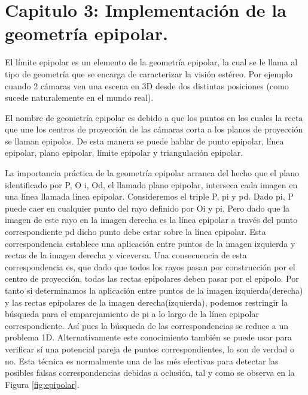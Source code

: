 \documentclass[11pt,letterpaper]{article}     %
\begin{document}



\section{Capitulo 3: Implementaci\' on de la geometr\' ia epipolar.}

El l\' imite epipolar es un elemento de la geometr\' ia epipolar, la cual se le llama al tipo de geometr\' ia que se encarga de caracterizar la visi\' on est\' ereo. Por ejemplo cuando 2 c\' amaras ven una escena en 3D desde dos distintas posiciones (como sucede naturalemente en el mundo real).

El nombre de geometr\' ia epipolar es debido a que los puntos en los cuales la recta que une los centros de proyecci\' on de las c\' amaras corta a los planos de proyecci\' on se llaman epipolos. De esta manera se puede hablar de punto epipolar, l\' inea epipolar, plano epipolar, l\' imite epipolar y triangulaci\' on epipolar.


La importancia práctica de la geometr\' ia epipolar arranca del hecho que el plano identificado por P, O
i, Od, el llamado plano epipolar, interseca cada imagen en una l\' inea llamada l\' inea epipolar. Consideremos el triple P, pi y pd. Dado pi, P puede caer en cualquier punto del rayo definido por Oi y pi.
Pero dado que la imagen de este rayo en la imagen derecha es la l\' inea epipolar a trav\' es del punto correspondiente pd dicho punto debe estar sobre la l\' inea epipolar. Esta correspondencia establece una aplicaci\' on entre puntos de la imagen izquierda y rectas de la imagen derecha y viceversa. Una consecuencia de esta
correspondencia es, que dado que todos los rayos pasan por construcci\' on por el centro de proyecci\' on, todas las rectas epipolares deben pasar por el epipolo.
Por tanto si determinamos la aplicaci\' on entre puntos de la imagen izquierda(derecha) y las rectas epipolares de la imagen derecha(izquierda), podemos restringir la b\' usqueda para el emparejamiento de pi a lo largo de la
l\' inea epipolar correspondiente. As\' i pues la b\' usqueda de las correspondencias se reduce a un problema 1D.
Alternativamente este conocimiento tambi\' en se puede usar para verificar s\' i una potencial pareja de puntos correspondientes, lo son de verdad o no. Esta t\' ecnica es normalmente una de las m\' es efectivas para detectar las posibles falsas correspondencias debidas a oclusi\' on, tal y como se observa en la Figura \ref{fig:epipolar}.
\end{document}
